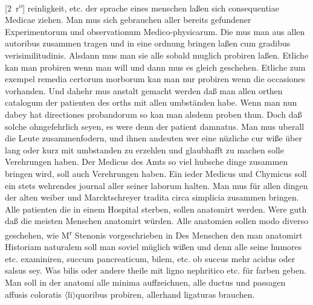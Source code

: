 [2~r\textsuperscript{o}]
reinligkeit, etc. der sprache eines menschen la{\ss}en sich consequentiae Medicae ziehen.
\pend%
\pstart%
Man mus sich gebrauchen aller bereits gefundener Experimentorum und observationum Medico-physicarum.
\pend%
\pstart%
Die mus man aus allen autoribus zusammen tragen und in eine ordnung bringen la{\ss}en cum gradibus verisimilitudinis. 
\pend%
\pstart%
 Alsdann mus man sie alle sobald muglich probiren la{\ss}en.
\pend%
\pstart%
Etliche kan man probiren wenn man will und dann mus es gleich geschehen.
\pend%
\pstart%
Etliche zum exempel remedia certorum morborum kan man nur probiren wenn die occasiones vorhanden. Und dahehr mus anstalt gemacht werden da{\ss} man allen orthen catalogum der patienten\protect{} des orths mit allen umbst\"{a}nden habe.
\pend%
\pstart%
Wenn man nun dabey hat directiones probandorum so kan man alsdenn proben thun. Doch da{\ss} solche ohngefehrlich seyen, es were denn der patient\protect{} damnatus.
\pend%
\pstart%
Man mus uberall die Leute zusammenfodern, und ihnen andeuten wer eine n\"{u}zliche cur\protect{} wi{\ss}e \"{u}ber lang oder kurz mit umbstanden zu erzehlen und glaubhafft zu machen solle Verehrungen haben. Der Medicus\protect{} des Amts so viel hubsche dinge zusammen bringen wird, soll auch Verehrungen haben.
\pend%
\pstart%
Ein ieder Medicus\protect{} und Chymicus\protect{} soll ein stets wehrendes journal aller seiner laborum halten.
\pend%
\pstart%
Man mus f\"{u}r allen dingen der alten weiber und Marcktschreyer tradita circa simplicia zusammen bringen.
\pend%
\pstart%
Alle patienten\protect{} die in einem Hospital\protect{} sterben, sollen anatomirt werden.
\pend%
\pstart%
Were guth da{\ss} die meisten Menschen anatomirt w\"{u}rden. 
\pend%
\newpage
\count{}
\count{}
\count{}
\pstart%
Alle anatomien\protect{} sollen modo diverso geschehen, wie M\textsuperscript{r} Stenonis\protect{} vorgeschrieben in
\pend%
\pstart%
Des Menschen den man anatomirt Historiam naturalem\protect{} soll man soviel m\"{u}glich wi{\ss}en und denn alle seine humores\protect{} etc. examiniren, succum pancreaticum\protect{}, bilem\protect{}, etc. ob succus mehr acidus oder salsus sey. Was bilis\protect{} oder andere theile mit ligno nephritico\protect{} etc. f\"{u}r farben geben.
\pend%
\pstart%
Man soll in der anatomi\protect{} alle minima auffzeichnen, alle ductus\protect{} und passagen\protect{} affusis coloratis $\langle$li$\rangle$quoribus probiren, allerhand ligaturas brauchen.%

